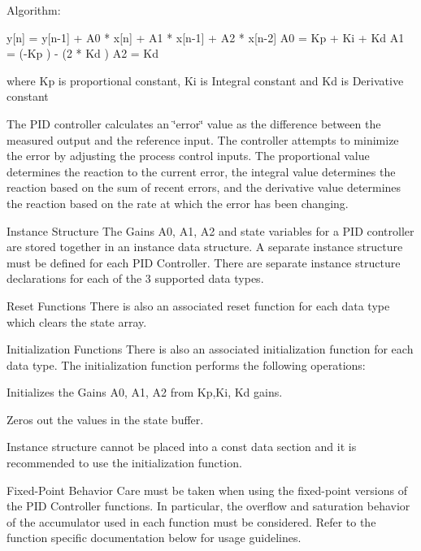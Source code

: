 \begin{DoxyParagraph}{Algorithm\+:}

\begin{DoxyPre}
   y[n] = y[n-1] + A0 * x[n] + A1 * x[n-1] + A2 * x[n-2]
   A0 = Kp + Ki + Kd
   A1 = (-Kp ) - (2 * Kd )
   A2 = Kd  \end{DoxyPre}

\end{DoxyParagraph}
\begin{DoxyParagraph}{}
where {\ttfamily Kp} is proportional constant, {\ttfamily Ki} is Integral constant and {\ttfamily Kd} is Derivative constant
\end{DoxyParagraph}
\begin{DoxyParagraph}{}
 
\end{DoxyParagraph}
\begin{DoxyParagraph}{}
The P\+ID controller calculates an \char`\"{}error\char`\"{} value as the difference between the measured output and the reference input. The controller attempts to minimize the error by adjusting the process control inputs. The proportional value determines the reaction to the current error, the integral value determines the reaction based on the sum of recent errors, and the derivative value determines the reaction based on the rate at which the error has been changing.
\end{DoxyParagraph}
\begin{DoxyParagraph}{Instance Structure}
The Gains A0, A1, A2 and state variables for a P\+ID controller are stored together in an instance data structure. A separate instance structure must be defined for each P\+ID Controller. There are separate instance structure declarations for each of the 3 supported data types.
\end{DoxyParagraph}
\begin{DoxyParagraph}{Reset Functions}
There is also an associated reset function for each data type which clears the state array.
\end{DoxyParagraph}
\begin{DoxyParagraph}{Initialization Functions}
There is also an associated initialization function for each data type. The initialization function performs the following operations\+:
\begin{DoxyItemize}
\item Initializes the Gains A0, A1, A2 from Kp,Ki, Kd gains.
\item Zeros out the values in the state buffer.
\end{DoxyItemize}
\end{DoxyParagraph}
\begin{DoxyParagraph}{}
Instance structure cannot be placed into a const data section and it is recommended to use the initialization function.
\end{DoxyParagraph}
\begin{DoxyParagraph}{Fixed-\/\+Point Behavior}
Care must be taken when using the fixed-\/point versions of the P\+ID Controller functions. In particular, the overflow and saturation behavior of the accumulator used in each function must be considered. Refer to the function specific documentation below for usage guidelines. 
\end{DoxyParagraph}
